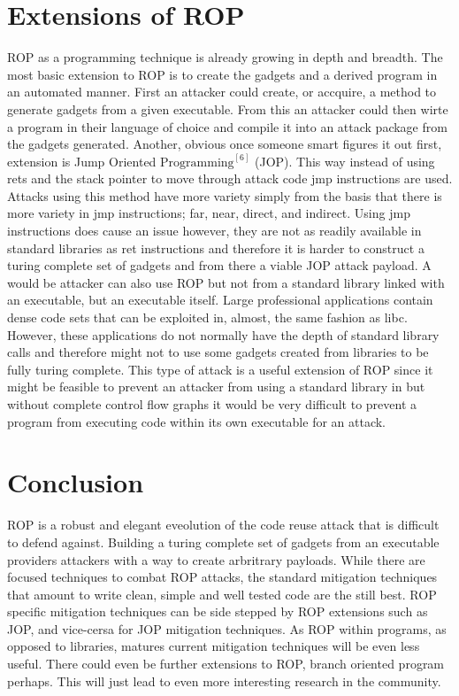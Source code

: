 \documentclass[11pt]{amsart}
\begin{document}
\section*{Extensions of ROP}
ROP as a programming technique is already growing in depth and breadth. The most basic extension to ROP is to create the gadgets and a derived program in an automated manner. First an attacker could create, or accquire, a method to generate gadgets from a given executable. From this an attacker could then wirte a program in their language of choice and compile it into an attack package from the gadgets generated.\newline \newline
Another, obvious once someone smart figures it out first, extension is Jump Oriented $\text{Programming}^{[6]}$ (JOP). This way instead of using rets and the stack pointer to move through attack code jmp instructions are used. Attacks using this method have more variety simply from the basis that there is more variety in jmp instructions; far, near, direct, and indirect. Using jmp instructions does cause an issue however, they are not as readily available in standard libraries as ret instructions and therefore it is harder to construct a turing complete set of gadgets and from there a viable JOP attack payload.\newline \newline
A would be attacker can also use ROP but not from a standard library linked with an executable, but an executable itself. Large professional applications contain dense code sets that can be exploited in, almost, the same fashion as libc. However, these applications do not normally have the depth of standard library calls and therefore might not to use some gadgets created from libraries to be fully turing complete. This type of attack is a useful extension of ROP since it might be feasible to prevent an attacker from using a standard library in but without complete control flow graphs it would be very difficult to prevent a program from executing code within its own executable for an attack.
\section*{Conclusion}
ROP is a robust and elegant eveolution of the code reuse attack that is difficult to defend against. Building a turing complete set of gadgets from an executable providers attackers with a way to create arbritrary payloads.  While there are focused techniques to combat ROP attacks, the standard mitigation techniques that amount to write clean, simple and well tested code are the still best. ROP specific mitigation techniques can be side stepped by ROP extensions such as JOP, and vice-cersa for JOP mitigation techniques. As ROP within programs, as opposed to libraries, matures current mitigation techniques will be even less useful. There could even be further extensions to ROP, branch oriented program perhaps.  This will just lead to even more interesting research in the community.
\end{document}
